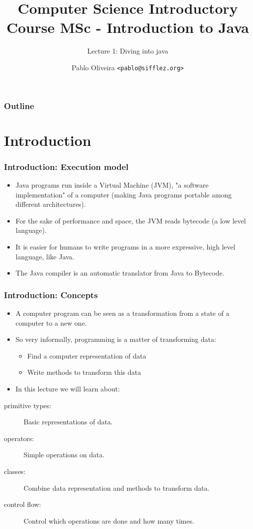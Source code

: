 \documentclass[10pt, handout]{beamer}
\title{Computer Science Introductory Course MSc - Introduction to Java}
\subtitle{Lecture 1: Diving into java}
\author[Pablo Oliveira]{Pablo Oliveira \texttt{<pablo@sifflez.org>}}
\institute{T\'el\'ecom ParisTech}
\date{}
\begin{document}
\begin{frame}
  \titlepage
\end{frame}

\begin{frame}
  \frametitle{Outline}
  \tableofcontents
\end{frame}

\section{Introduction}
\begin{frame}[fragile]
  \frametitle{Introduction: Execution model}
  \begin{itemize}
    \item Java programs run inside a Virtual Machine (JVM), "a software implementation" of a computer
          (making Java programs portable among different architectures).
    \item For the sake of performance and space, the JVM reads bytecode (a low level language).
    \item It is easier for humans to write programs in a more expressive, high level language, like Java.
    \item The Java compiler is an automatic translator from Java to Bytecode.
  \end{itemize}
\end{frame}

\begin{frame}[fragile]
  \frametitle{Introduction: Concepts}
  \begin{itemize}
   \item A computer program can be seen as a transformation from a state of a computer to a new one.
   \item So very informally, programming is a matter of transforming data:
    \begin{itemize}
      \item Find a computer representation of data
      \item Write methods to transform this data
    \end{itemize}
   \item In this lecture we will learn about:
  \end{itemize}
   \begin{description}
      \item[primitive types:] Basic representations of data.
      \item[      operators:] Simple operations on data.
      \item[        classes:] Combine data representation and methods to transform data.
      \item[   control flow:] Control which operations are done and how many times.
   \end{description}
\end{frame}
\end{document}
